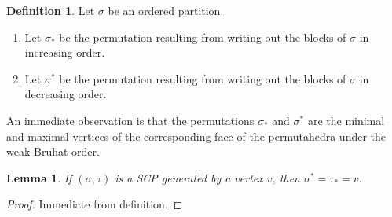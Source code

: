 \documentclass{amsart}
\newtheorem{lemma}[theorem]{Lemma}
\theoremstyle{definition}
\newtheorem{definition}[theorem]{Definition}
\begin{document}
\begin{definition}
Let $\sigma$ be an ordered partition. 
\begin{enumerate}
    \item Let $\sigma_*$ be the permutation resulting from writing out the blocks of $\sigma$ in increasing order.
    \item Let $\sigma^*$ be the permutation resulting from writing out the blocks of $\sigma$ in decreasing order.
\end{enumerate}
\end{definition}
An immediate observation is that the permutations $\sigma_*$ and $\sigma^*$ are the minimal and maximal vertices of the corresponding face of the permutahedra under the weak Bruhat order.
\begin{lemma}
If $(\sigma,\tau)$ is a SCP generated by a vertex $v$, then  $\sigma^* = \tau_*= v$.
\end{lemma}
\begin{proof}
Immediate from definition.
\end{proof}
\end{document}
